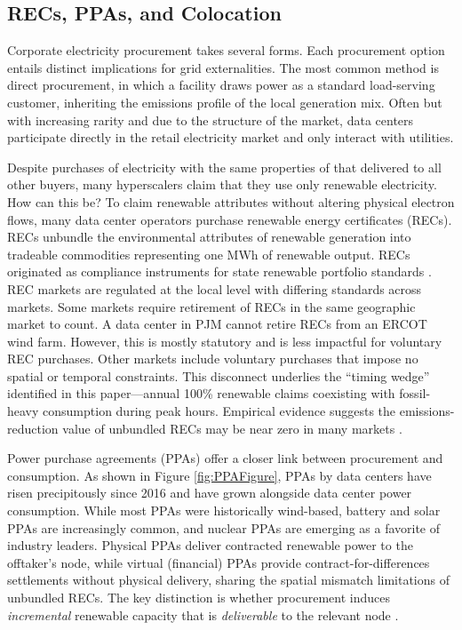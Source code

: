 \documentclass[a4paper,fleqn,longmktitle]{cas-sc}
\begin{document}
\subsection{RECs, PPAs, and Colocation}
Corporate electricity procurement takes several forms. Each procurement option entails distinct implications for grid externalities. The most common method is direct procurement, in which a facility draws power as a standard load-serving customer, inheriting the emissions profile of the local generation mix. Often but with increasing rarity and due to the structure of the market, data centers participate directly in the retail electricity market and only interact with utilities.

Despite purchases of electricity with the same properties of that delivered to all other buyers, many hyperscalers claim that they use only renewable electricity. How can this be? To claim renewable attributes without altering physical electron flows, many data center operators purchase renewable energy certificates (RECs). RECs unbundle the environmental attributes of renewable generation into tradeable commodities representing one MWh of renewable output. RECs originated as compliance instruments for state renewable portfolio standards \citep{epa_rec_definition,wiser2004alternative}. REC markets are regulated at the local level with differing standards across markets. Some markets require retirement of RECs in the same geographic market to count. A data center in PJM cannot retire RECs from an ERCOT wind farm. However, this is mostly statutory and is less impactful for voluntary REC purchases. Other markets include voluntary purchases that impose no spatial or temporal constraints.  This disconnect underlies the ``timing wedge'' identified in this paper—annual 100\% renewable claims coexisting with fossil-heavy consumption during peak hours. Empirical evidence suggests the emissions-reduction value of unbundled RECs may be near zero in many markets \citep{bjorn2022recs,gillenwater2007recs}.

Power purchase agreements (PPAs) offer a closer link between procurement and consumption. As shown in Figure \ref{fig:PPAFigure}, PPAs by data centers have risen precipitously since 2016 and have grown alongside data center power consumption. While most PPAs were historically wind-based, battery and solar PPAs are increasingly common, and nuclear PPAs are emerging as a favorite of industry leaders. Physical PPAs deliver contracted renewable power to the offtaker's node, while virtual (financial) PPAs provide contract-for-differences settlements without physical delivery, sharing the spatial mismatch limitations of unbundled RECs. The key distinction is whether procurement induces \textit{incremental} renewable capacity that is \textit{deliverable} to the relevant node \citep{taheri2025ppa,kobus2021ppa}.
\end{document}
